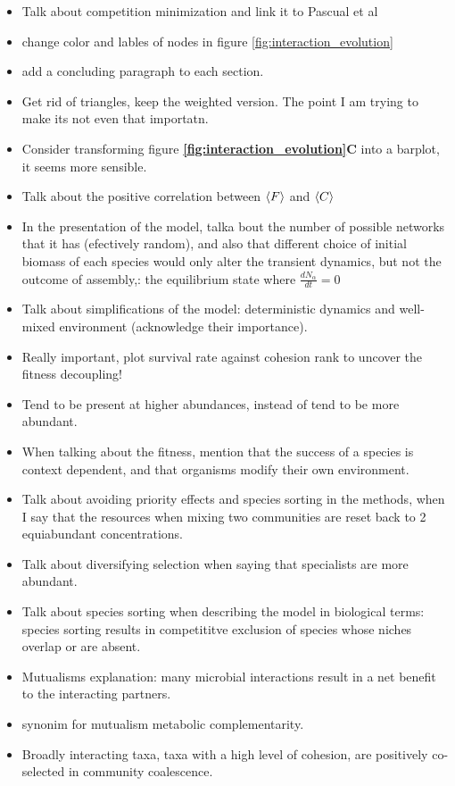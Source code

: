 \documentclass[titlepage,11pt]{article}
\begin{document}
\begin{linenumbers}
\begin{singlespace}
\begin{itemize}
	\item Talk about competition minimization and link it to Pascual et al
	\item change color and lables of nodes in figure \ref{fig:interaction_evolution}
	\item add a concluding paragraph to each section.
	\item Get rid of triangles, keep the weighted version. The point I am trying to make its not even that importatn.
	\item Consider transforming figure \textbf{\ref{fig:interaction_evolution}C} into a barplot, it seems more sensible.
	\item Talk about the positive correlation between $ \braket{F} $ and $ \braket{C} $
	\item In the presentation of the model, talka bout the number of possible networks that it has (efectively random), and also that different choice of initial biomass of each species would only alter the transient dynamics, but not the outcome of assembly,: the equilibrium state where $ \frac{dN_{\alpha}}{dt} = 0 $
	\item Talk about simplifications of the model: deterministic dynamics and well-mixed environment (acknowledge their importance).
	\item Really important, plot survival rate against cohesion rank to uncover the fitness decoupling!
	\item Tend to be present at higher abundances, instead of tend to be more abundant.
	\item When talking about the fitness, mention that the success of a species is context dependent, and that organisms modify their own environment.
	\item Talk about avoiding priority effects and species sorting in the methods, when I say that the resources when mixing two communities are reset back to 2 equiabundant concentrations.
	\item Talk about diversifying selection when saying that specialists are more abundant.
	\item Talk about species sorting when describing the model in biological terms: species sorting results in competititve exclusion of species whose niches overlap or are absent.
	\item Mutualisms explanation: many microbial interactions result in a net benefit to the interacting partners. 
	\item synonim for mutualism metabolic complementarity.
	\item Broadly interacting taxa, taxa with a high level of cohesion, are positively co-selected in community coalescence.

\end{itemize}
\end{singlespace}
\end{linenumbers}
\end{document}
